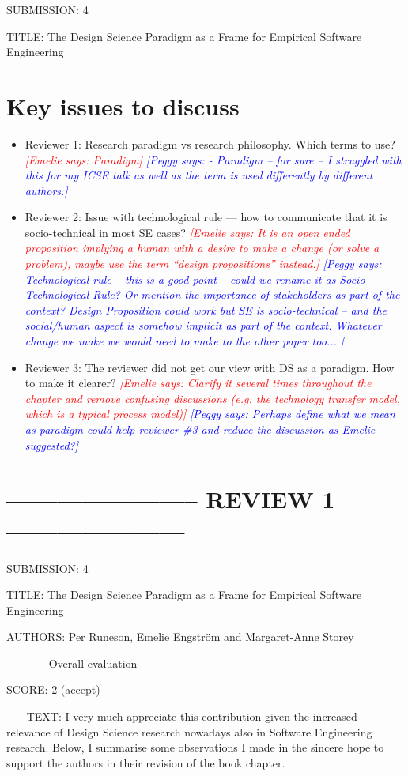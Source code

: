 \documentclass{article}
\newcommand{\emelie}[1]{\textcolor{red}{{\it [Emelie says: #1]}}}
\newcommand{\peggy}[1]{\textcolor{blue}{{\it [Peggy says: #1]}}}
\newcommand{\emelie}[1]{}
\newcommand{\peggy}[1]{}
\begin{document}
SUBMISSION: 4

TITLE: The Design Science Paradigm as a Frame for Empirical Software Engineering

\section*{Key issues to discuss}
\begin{itemize}
\item Reviewer 1: Research paradigm vs research philosophy. Which terms to use?
\emelie{Paradigm}
\peggy{- Paradigm -- for sure -- I struggled with this for my ICSE talk as well as the term is used differently by different authors.}
\item Reviewer 2: Issue with technological rule — how to communicate that it is socio-technical in most SE cases?
\emelie{It is an open ended proposition implying a human with a desire to make a change (or solve a problem), maybe use the term “design propositions” instead.}
\peggy{Technological rule -- this is a good point -- could we rename it as Socio-Technological Rule?  Or mention the importance of stakeholders as part of the context?  Design Proposition could work but SE is socio-technical -- and the social/human aspect is somehow implicit as part of the context.  Whatever change we make we would need to make to the other paper too... }
\item Reviewer 3: The reviewer did not get our view with DS as a paradigm. How to make it clearer?
\emelie{Clarify it several times throughout the chapter and remove confusing discussions (e.g. the technology transfer model, which is a typical process model)}
\peggy{Perhaps define what we mean as paradigm could help reviewer \#3 and reduce the discussion as Emelie suggested?}
\end{itemize}

\section*{----------------------- REVIEW 1 ---------------------}

SUBMISSION: 4

TITLE: The Design Science Paradigm as a Frame for Empirical Software Engineering

AUTHORS: Per Runeson, Emelie Engström and Margaret-Anne Storey

----------- Overall evaluation -----------

SCORE: 2 (accept)

----- TEXT:
I very much appreciate this contribution given the increased relevance of Design Science research nowadays also in Software Engineering research. Below, I summarise some observations I made in the sincere hope to support the authors in their revision of the book chapter.
\end{document}
